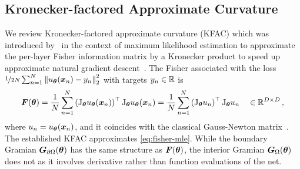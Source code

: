 \subsection{Kronecker-factored Approximate Curvature}\label{sec:kfac-background}

We review Kronecker-factored approximate curvature (KFAC) which was introduced by~\citet{heskes2000natural, martens2015optimizing} in the context of maximum likelihood estimation to approximate the per-layer Fisher information matrix by a Kronecker product to speed up approximate natural gradient descent~\cite{amari1998natural}.
The Fisher associated with the loss $\nicefrac{1}{2N} \sum_{n=1}^N \left\lVert u_{\bm{\theta}}({\bm{x}}_n) - y_n \right\rVert_2^2$ with targets $y_n \in {\mathbb{R}}$ is
\begin{equation}\label{eq:fisher-mle}
  {\bm{F}}({\bm{\theta}})
  =
  \frac{1}{N}
  \sum_{n=1}^N
  \left(\mathrm{J}_{{\bm{\theta}}} u_{{\bm{\theta}}}({\bm{x}}_n)  \right)^\top
  \mathrm{J}_{{\bm{\theta}}} u_{{\bm{\theta}}}({\bm{x}}_n)
  =
  \frac{1}{N}
  \sum_{n=1}^N
  \left( \mathrm{J}_{{\bm{\theta}}} u_n \right)^\top
  \mathrm{J}_{{\bm{\theta}}} u_n
  \quad\in {\mathbb{R}}^{D\times D}\,,
\end{equation}
where $u_n = u_{\bm{\theta}}({\bm{x}}_n)$, and it coincides with the classical Gauss-Newton matrix~\citep{martens2020new}.
The established KFAC approximates \eqref{eq:fisher-mle}.
While the boundary Gramian ${\bm{G}}_{\partial\Omega}({\bm{\theta}})$ has the same structure as ${\bm{F}}({\bm{\theta}})$, the interior Gramian ${\bm{G}}_\Omega({\bm{\theta}})$ does not as it involves derivative rather than function evaluations of the net.


